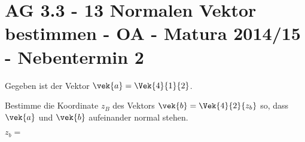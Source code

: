 \section{AG 3.3 - 13 Normalen Vektor bestimmen - OA - Matura 2014/15 - Nebentermin 2}

\begin{beispiel}[AG 3.3]{1} %
				Gegeben ist der Vektor $\vek{a}=\Vek{4}{1}{2}$.
				
				Bestimme die Koordinate $z_{B}$ des Vektors $\vek{b}=\Vek{4}{2}{z_{b}}$ so, dass $\vek{a}$ und $\vek{b}$ aufeinander normal stehen.\leer
				
				$z_{b}=$ 
\end{beispiel}